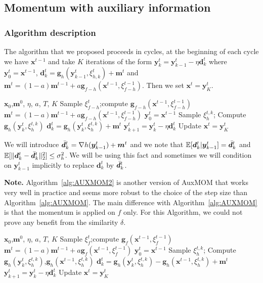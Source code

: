 \documentclass[10pt]{article} %
\theoremstyle{plain}
\theoremstyle{definition}
\theoremstyle{remark}
\newcommand{\norm}[1]{\|#1\|_2}
\def\vd{{\bm{d}}}
\def\vg{{\bm{g}}}
\def\vm{{\bm{m}}}
\def\vx{{\bm{x}}}
\def\vy{{\bm{y}}}
\newcommand{\E}{\mathbb{E}}
\begin{document}
\subsection{Momentum with auxiliary information}\label{AUXMOMC2}
\subsubsection{Algorithm description}\label{App Momentum}
The algorithm that we proposed proceeds in cycles, at the beginning of each cycle we have $\vx^{t-1}$ and take $K$ iterations of the form $\vy^t_k = \vy^t_{k-1} - \eta \vd^t_k$ where $\vy^t_0 = \vx^{t-1}$, $\vd^t_k  =  \vg_h(\vy^t_{k-1},\xi^t_{h,k}) + \vm^t$ and $\vm^t  =  (1-a)\vm^{t-1} + a \vg_{f-h}(\vx^{t-1},\xi^{t-1}_{f-h})$. Then we set $\vx^t = \vy^t_K$.

\begin{algorithm}[h]
\begin{algorithmic}
\REQUIRE $\vx_0$,$\vm^0$, $\eta$, $a$, $T$, $K$
\STATE  Sample $\xi^t_{f-h}$;\:compute $\vg_{f-h}(\vx^{t-1},\xi^{t-1}_{f-h})$
\STATE $\vm^t = (1-a)\vm^{t-1} + a \vg_{f-h}(\vx^{t-1},\xi^{t-1}_{f-h})$
\STATE $\vy^t_0 = \vx^{t-1}$
\STATE Sample $\xi^{t,k}_h$;\: Compute $\vg_h(\vy^{t}_k,\xi^{t,k}_h)$
\STATE $\vd^t_k = \vg_h(\vy^{t}_k,\xi^{t,k}_h) + \vm^t$
\STATE $\vy^t_{k+1} = \vy^t_{k} - \eta \vd^t_k$
\ENDFOR
\STATE Update $\vx^t  = \vy^t_{K}$
\ENDFOR
\end{algorithmic}
\caption{AuxMOM$(f,h)$} 
\label{alg:AUXMOM}
\end{algorithm}


We will introduce $\Bar{\vd}^t_k  =  \nabla h(\vy^t_{k-1}) + \vm^t$ and we note that $\E[\vd^t_k|\vy^t_{k-1}] = \Bar{\vd}^t_k$ and $\E[\norm{\vd^t_k - \Bar{\vd}^t_k}^2]\leq \sigma_h^2$. We will be using this fact and sometimes we will condition on $\vy^t_{k-1}$ implicitly to replace $\vd^t_k$ by $\Bar{\vd}^t_k$.



\textbf{Note.} Algorithm~\ref{alg:AUXMOM2} is another version of AuxMOM that works very well in practice and seems more robust to the choice of the step size than Algorithm~\ref{alg:AUXMOM}. The main difference with Algorithm~\ref{alg:AUXMOM} is that the momentum is applied on $f$ only. For this Algorithm, we could not prove any benefit from the similarity $\delta$.
\begin{algorithm}[h]
\begin{algorithmic}
\REQUIRE $\vx_0$,$\vm^0$, $\eta$, $a$, $T$, $K$
\STATE  Sample $\xi^t_{f}$;\:compute $\vg_{f}(\vx^{t-1},\xi^{t-1}_{f})$
\STATE $\vm^t = (1-a)\vm^{t-1} + a \vg_{f}(\vx^{t-1},\xi^{t-1}_{f})$
\STATE $\vy^t_0 = \vx^{t-1}$
\STATE Sample $\xi^{t,k}_h$;\: Compute $\vg_h(\vy^{t}_k,\xi^{t,k}_h)$,$\vg_h(\vx^{t-1},\xi^{t,k}_h)$
\STATE $\vd^t_k = \vg_h(\vy^{t}_k,\xi^{t,k}_h) - \vg_h(\vx^{t-1},\xi^{t,k}_h) + \vm^t$
\STATE $\vy^t_{k+1} = \vy^t_{k} - \eta \vd^t_k$
\ENDFOR
\STATE Update $\vx^t  = \vy^t_{K}$
\ENDFOR
\end{algorithmic}
\caption{AuxMOM$(f,h)-V0$} 
\label{alg:AUXMOM2}
\end{algorithm}
\end{document}
